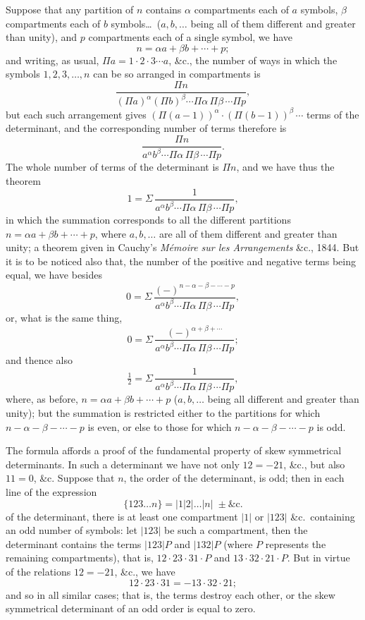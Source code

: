 \documentclass[11pt,a4paper]{article}
\begin{document}
Suppose that any partition of $n$ contains $\alpha$ compartments each of $a$ symbols, $\beta$ compartments each of $b$ symbols\ldots\ ($a,b,\ldots$ being all of them different and greater than unity), and $p$ compartments each of a single symbol, we have
\[
n=\alpha a+\beta b+\cdots+p;
\]
and writing, as usual, $\Pi a=1\cdot 2\cdot 3\cdots a$, \&c., the number of ways in which the symbols $1,2,3,\ldots,n$ can be so arranged in compartments is
\[
\frac{\Pi n}{(\Pi a)^\alpha (\Pi b)^\beta \cdots \Pi\alpha\,\Pi\beta\,\cdots \Pi p},
\]
but each such arrangement gives $(\Pi(a-1))^\alpha\cdot(\Pi(b-1))^\beta\,\cdots$ terms of the determinant, and the corresponding number of terms therefore is
\[
\frac{\Pi n}{a^\alpha b^\beta \cdots \Pi\alpha\,\Pi\beta\,\cdots \Pi p}.
\]
The whole number of terms of the determinant is $\Pi n$, and we have thus the theorem
\[
1=\Sigma\,\frac{1}{a^\alpha b^\beta \cdots \Pi\alpha\,\Pi\beta\,\cdots \Pi p},
\]
in which the summation corresponds to all the different partitions $n=\alpha a+\beta b+\cdots+p$, where $a,b,\ldots$ are all of them different and greater than unity; a theorem given in Cauchy's \textit{M\'{e}moire sur les Arrangements} \&c., 1844. But it is to be noticed also that, the number of the positive and negative terms being equal, we have besides
\[
0=\Sigma\,\frac{(-)^{n-\alpha-\beta-\cdots-p}}{a^\alpha b^\beta \cdots \Pi\alpha\,\Pi\beta\,\cdots \Pi p},
\]
or, what is the same thing,
\[
0=\Sigma\,\frac{(-)^{\alpha+\beta+\cdots}}{a^\alpha b^\beta \cdots \Pi\alpha\,\Pi\beta\,\cdots \Pi p};
\]
and thence also
\[
\tfrac{1}{2}=\Sigma\,\frac{1}{a^\alpha b^\beta \cdots \Pi\alpha\,\Pi\beta\,\cdots \Pi p},
\]
where, as before, $n=\alpha a+\beta b+\cdots+p$ ($a,b,\ldots$ being all different and greater than unity); but the summation is restricted either to the partitions for which $n-\alpha-\beta-\cdots-p$ is even, or else to those for which $n-\alpha-\beta-\cdots-p$ is odd.

The formula affords a proof of the fundamental property of skew symmetrical determinants. In such a determinant we have not only $12=-21$, \&c., but also $11=0$, \&c. Suppose that $n$, the order of the determinant, is odd; then in each line of the expression
\[
\{123\ldots n\}=|1|2|\ldots|n|\;\pm\&\mathrm{c}.
\]
of the determinant, there is at least one compartment $|1|$ or $|123|$ \&c.\ containing an odd number of symbols: let $|123|$ be such a compartment, then the determinant contains the terms $|123|P$ and $|132|P$ (where $P$ represents the remaining compartments), that is, $12\cdot 23\cdot 31\cdot P$ and $13\cdot 32\cdot 21\cdot P$. But in virtue of the relations $12=-21$, \&c., we have
\[
12\cdot 23\cdot 31=-13\cdot 32\cdot 21;
\]
and so in all similar cases; that is, the terms destroy each other, or the skew symmetrical determinant of an odd order is equal to zero.
\end{document}
